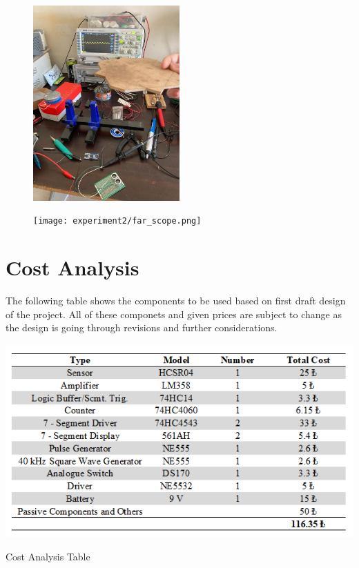 \documentclass[12pt, a4paper]{article}
\begin{document}
        \begin{figure}[H]\centering
            \includegraphics[width=0.5\textwidth]{experiment2/far.jpg}
            \caption[]{}\label{fig:far}
        \end{figure}

        \begin{figure}[H]\centering
            \texttt{[image: experiment2/far\_scope.png]}
            \caption[]{}\label{fig:far_scope}
        \end{figure}


        





    
    \section{Cost Analysis}

        The following table shows the components to be used based on first draft design of the project. All of these componets and given prices are subject to change as the design is going through revisions and further considerations.
        
        \begin{table}[H]\centering
            \includegraphics[width=\textwidth]{cost.png}
            \caption[]{Cost Analysis Table}\label{tab:cost}
        \end{table}
\end{document}
